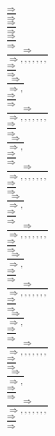 \documentclass[11pt]{article}
\begin{document}
\begin{center}
\bigskip
\\$\frac{\Rightarrow }{\Rightarrow }$
\bigskip
\\$\frac{\Rightarrow }{\Rightarrow }$
\bigskip
\\$\frac{\Rightarrow }{\Rightarrow }$
\bigskip
\\$\frac{\Rightarrow }{\Rightarrow , , , , , , , }$
\bigskip
\\$\frac{\Rightarrow }{\Rightarrow }$
\bigskip
\\$\frac{\Rightarrow }{\Rightarrow , }$
\bigskip
\\$\frac{\Rightarrow }{\Rightarrow }$
\bigskip
\\$\frac{\Rightarrow }{\Rightarrow , , , , , , , }$
\bigskip
\\$\frac{\Rightarrow }{\Rightarrow }$
\bigskip
\\$\frac{\Rightarrow }{\Rightarrow , }$
\bigskip
\\$\frac{\Rightarrow }{\Rightarrow }$
\bigskip
\\$\frac{\Rightarrow }{\Rightarrow , , , , , , , }$
\bigskip
\\$\frac{\Rightarrow }{\Rightarrow }$
\bigskip
\\$\frac{\Rightarrow }{\Rightarrow , }$
\bigskip
\\$\frac{\Rightarrow }{\Rightarrow }$
\bigskip
\\$\frac{\Rightarrow }{\Rightarrow , , , , , , , }$
\bigskip
\\$\frac{\Rightarrow }{\Rightarrow }$
\bigskip
\\$\frac{\Rightarrow }{\Rightarrow , }$
\bigskip
\\$\frac{\Rightarrow }{\Rightarrow }$
\bigskip
\\$\frac{\Rightarrow }{\Rightarrow , , , , , , , }$
\bigskip
\\$\frac{\Rightarrow }{\Rightarrow }$
\bigskip
\\$\frac{\Rightarrow }{\Rightarrow , }$
\bigskip
\\$\frac{\Rightarrow }{\Rightarrow }$
\bigskip
\\$\frac{\Rightarrow }{\Rightarrow , , , , , , , }$
\bigskip
\\$\frac{\Rightarrow }{\Rightarrow }$
\bigskip
\\$\frac{\Rightarrow }{\Rightarrow , }$
\bigskip
\\$\frac{\Rightarrow }{\Rightarrow }$
\bigskip
\\$\frac{\Rightarrow }{\Rightarrow , , , , , , , }$
\bigskip
\\$\frac{\Rightarrow }{\Rightarrow }$

\end{center}
\end{document}
